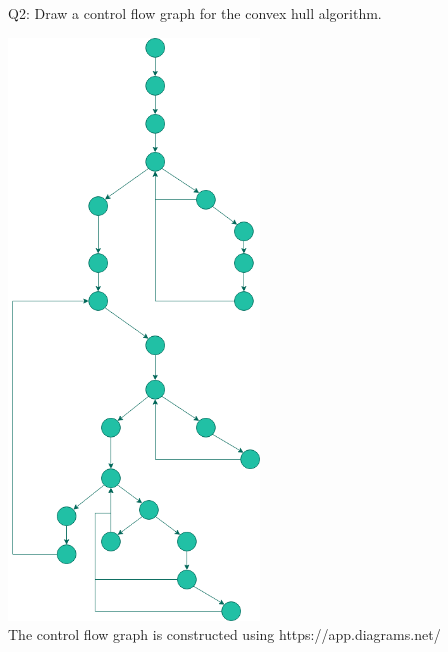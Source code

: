 \documentclass[12pt]{article}
\begin{document}
\medskip

\newpage

\noindent Q2: Draw a control flow graph for the convex hull algorithm.

\begin{center}
  \includegraphics[width=0.5\textwidth]{Control_Flow_Graph.png} \\
  The control flow graph is constructed using https://app.diagrams.net/
\end{center}
\end{document}
